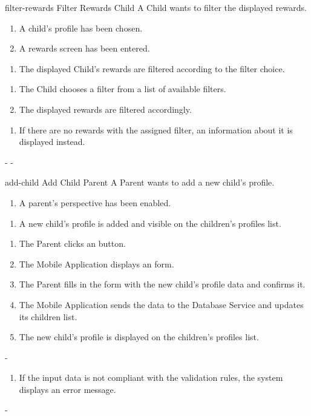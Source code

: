 {filter-rewards}
{Filter Rewards}
{Child}
{A Child wants to filter the displayed rewards.}
{\begin{enumerate} %
    \item A child's profile has been chosen.
    \item A rewards screen has been entered.
\end{enumerate}}
{\begin{enumerate} %
    \item The displayed Child's rewards are filtered according to the filter choice. 
\end{enumerate}}
{\begin{enumerate} %
    \item The Child chooses a filter from a list of available filters.
    \item The displayed rewards are filtered accordingly.
\end{enumerate}}
{\begin{enumerate} %
[label=2.\alph*.]
    \item If there are no rewards with the assigned filter, an information about it is displayed instead.
\end{enumerate}}
{-} %
{-} %


{add-child}
{Add Child}
{Parent}
{A Parent wants to add a new child's profile.}
{\begin{enumerate} %
    \item A parent's perspective has been enabled.
\end{enumerate}}
{\begin{enumerate} %
   \item A new child's profile is added and visible on the children's profiles list.
\end{enumerate}}
{\begin{enumerate} %
   \item The Parent clicks an  button.
   \item The Mobile Application displays an  form.
   \item The Parent fills in the form with the new child's profile data and confirms it.
   \item The Mobile Application sends the data to the Database Service and updates its children list.
   \item The new child's profile is displayed on the children's profiles list.
\end{enumerate}}
{-}%
{\begin{enumerate} %
[label=3.\alph*.]
    \item If the input data is not compliant with the validation rules, the system displays an error message.
\end{enumerate}}
{-} %


